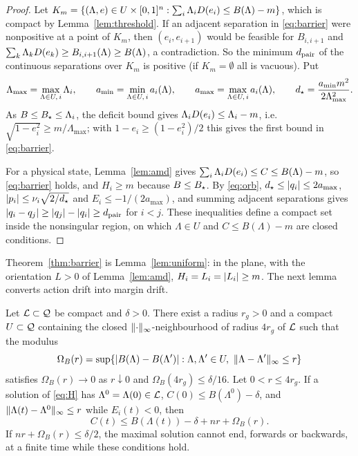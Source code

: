 \begin{proof}
Let $K_m=\{(\Lambda,e)\in U\times[0,1]^n:\sum_i\Lambda_iD(e_i)\le B(\Lambda)-m\}$, which is compact by Lemma~\ref{lem:threshold}. If an adjacent separation in \eqref{eq:barrier} were nonpositive at a point of $K_m$, then $(e_i,e_{i+1})$ would be feasible for $B_{i,i+1}$ and $\sum_k\Lambda_kD(e_k)\ge B_{i,i+1}(\Lambda)\ge B(\Lambda)$, a contradiction. So the minimum $d_{\mathrm{pair}}$ of the continuous separations over $K_m$ is positive (if $K_m=\emptyset$ all is vacuous). Put
\begin{equation}
\label{eq:dstar}
\Lambda_{\max}=\max_{\Lambda\in U,\,i}\Lambda_i,\qquad a_{\min}=\min_{\Lambda\in U,\,i}a_i(\Lambda),\qquad a_{\max}=\max_{\Lambda\in U,\,i}a_i(\Lambda),\qquad d_\star=\frac{a_{\min}m^2}{2\Lambda_{\max}^2}.
\end{equation}
As $B\le B_\star\le\Lambda_i$, the deficit bound gives $\Lambda_iD(e_i)\le\Lambda_i-m$, i.e.\ $\sqrt{1-e_i^2}\ge m/\Lambda_{\max}$; with $1-e_i\ge(1-e_i^2)/2$ this gives the first bound in \eqref{eq:barrier}.

For a physical state, Lemma~\ref{lem:amd} gives $\sum_i\Lambda_iD(e_i)\le C\le B(\Lambda)-m$, so \eqref{eq:barrier} holds, and $H_i\ge m$ because $B\le B_\star$. By \eqref{eq:orb}, $d_\star\le\lvert q_i\rvert\le2a_{\max}$, $\lvert p_i\rvert\le\nu_i\sqrt{2/d_\star}$ and $E_i\le-1/(2a_{\max})$, and summing adjacent separations gives $\lvert q_i-q_j\rvert\ge\lvert q_j\rvert-\lvert q_i\rvert\ge d_{\mathrm{pair}}$ for $i<j$. These inequalities define a compact set inside the nonsingular region, on which $\Lambda\in U$ and $C\le B(\Lambda)-m$ are closed conditions.
\end{proof}

Theorem~\ref{thm:barrier} is Lemma~\ref{lem:uniform}: in the plane, with the orientation $L>0$ of Lemma~\ref{lem:amd}, $H_i=L_i=\lvert L_i\rvert\ge m$. The next lemma converts action drift into margin drift.

\begin{lemma}
\label{lem:moving}
Let $\mathcal{L}\subset\mathcal{Q}$ be compact and $\delta>0$. There exist a radius $r_g>0$ and a compact $U\subset\mathcal{Q}$ containing the closed $\lVert \cdot\rVert_\infty$-neighbourhood of radius $4r_g$ of $\mathcal{L}$ such that the modulus
\[
\Omega_B(r)=\sup\{\lvert B(\Lambda)-B(\Lambda')\rvert:\Lambda,\Lambda'\in U,\ \lVert \Lambda-\Lambda'\rVert_\infty\le r\}
\]
satisfies $\Omega_B(r)\to0$ as $r\downarrow0$ and $\Omega_B(4r_g)\le\delta/16$. Let $0<r\le4r_g$. If a solution of \eqref{eq:H} has $\Lambda^0=\Lambda(0)\in\mathcal{L}$, $C(0)\le B(\Lambda^0)-\delta$, and $\lVert \Lambda(t)-\Lambda^0\rVert_\infty\le r$ while $E_i(t)<0$, then
\begin{equation}
\label{eq:moving}
C(t)\le B(\Lambda(t))-\delta+nr+\Omega_B(r).
\end{equation}
If $nr+\Omega_B(r)\le\delta/2$, the maximal solution cannot end, forwards or backwards, at a finite time while these conditions hold.
\end{lemma}

